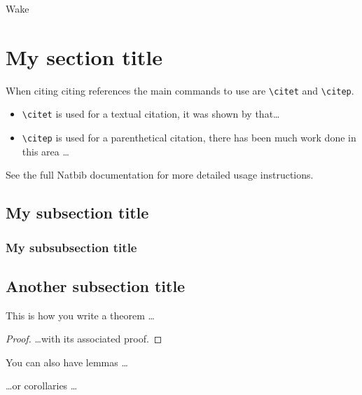 \begin{chapter}{\label{cha:wake}Wake}

  \section{\label{sec:a_label}My section title}
  When citing citing references the main commands to use are \verb"\citet" and
  \verb"\citep".

  \begin{itemize}
    \item \verb"\citet" is used for a textual citation, \eg it was shown by
      \citet{allen_zaremba_13} that\ldots
    \item \verb"\citep" is used for a parenthetical citation, \eg there has
      been much work done in this area \citep[see, for
      example,][]{allen_zaremba_13,Neely}\ldots
  \end{itemize}

  \noindent See the full Natbib documentation for more detailed usage
  instructions.

  \subsection{\label{subsec:another_label}My subsection title}

  \subsubsection{\label{sssec:yet_another_label}My subsubsection title}

  \subsection{\label{subsec:some_other_label}Another subsection title}
  \begin{theorem}
    This is how you write a theorem \ldots
  \end{theorem}
  \begin{proof}
    \ldots with its associated proof.
  \end{proof}

  \begin{lemma}
    You can also have lemmas \ldots
  \end{lemma}

  \begin{corollary}
    \ldots or corollaries \ldots
  \end{corollary}


\end{chapter}
